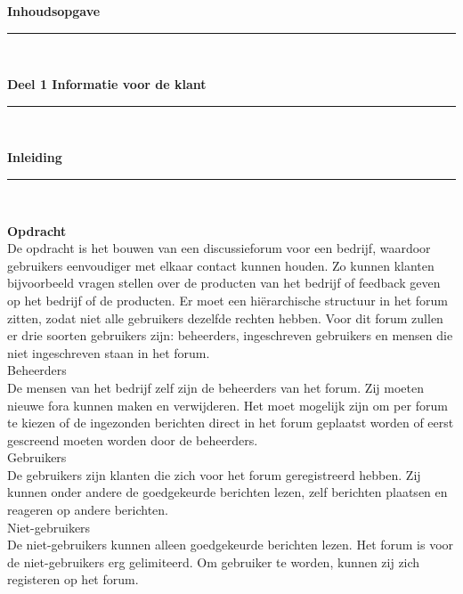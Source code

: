 \documentclass[a4paper,12pt]{article}
\newcommand{\HRule}{\rule{\linewidth}{0.5mm}}
\begin{document}


\newpage
\begin{center}
{ \LARGE \bfseries Inhoudsopgave}\\[0.1cm]
\HRule \\[0.5cm]
\end{center}

\newpage
\begin{center}
{\LARGE \bfseries Deel 1 Informatie voor de klant}\\[0.1cm]
\HRule \\[0.5cm]
\end{center}

\newpage
\begin{center}
{ \LARGE \bfseries Inleiding}\\[0.1cm]
\HRule \\[0.5cm]
\end{center}
{\bfseries Opdracht}\\
De opdracht is het bouwen van een discussieforum voor een bedrijf, waardoor gebruikers eenvoudiger met elkaar contact kunnen houden. Zo kunnen klanten bijvoorbeeld vragen stellen over de producten van het bedrijf of feedback geven op het bedrijf of de producten. Er moet een hi\"erarchische structuur in het forum zitten, zodat niet alle gebruikers dezelfde rechten hebben.
Voor dit forum zullen er drie soorten gebruikers zijn: beheerders, ingeschreven gebruikers en mensen die niet ingeschreven staan in het forum.\\

Beheerders\\
De mensen van het bedrijf zelf zijn  de beheerders van het forum. Zij moeten nieuwe fora kunnen maken en verwijderen. Het moet mogelijk zijn om per forum te kiezen of de ingezonden berichten direct in het forum geplaatst worden of eerst gescreend moeten worden door de beheerders.\\

Gebruikers\\
De gebruikers zijn klanten die zich voor  het forum geregistreerd hebben. Zij kunnen onder andere de goedgekeurde berichten lezen, zelf berichten plaatsen en reageren op andere berichten. \\

Niet-gebruikers\\
De niet-gebruikers kunnen alleen goedgekeurde berichten lezen. Het forum is voor de niet-gebruikers erg gelimiteerd. Om gebruiker te worden, kunnen zij zich registeren op het forum. \\
\end{document}

